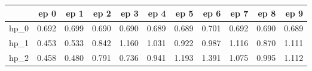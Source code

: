 \begin{tabular}{lrrrrrrrrrr}
\toprule
{} &   ep 0 &   ep 1 &   ep 2 &   ep 3 &   ep 4 &   ep 5 &   ep 6 &   ep 7 &   ep 8 &   ep 9 \\
\midrule
hp\_0 &  0.692 &  0.699 &  0.690 &  0.690 &  0.689 &  0.689 &  0.701 &  0.692 &  0.690 &  0.689 \\
hp\_1 &  0.453 &  0.533 &  0.842 &  1.160 &  1.031 &  0.922 &  0.987 &  1.116 &  0.870 &  1.111 \\
hp\_2 &  0.458 &  0.480 &  0.791 &  0.736 &  0.941 &  1.193 &  1.391 &  1.075 &  0.995 &  1.112 \\
\bottomrule
\end{tabular}
